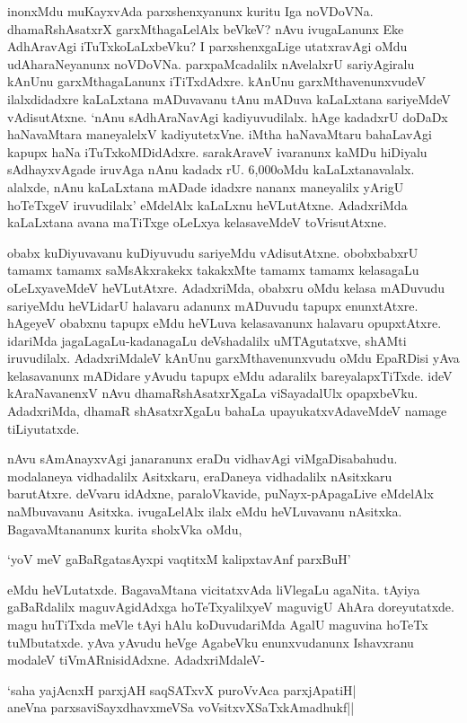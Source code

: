 inonxMdu muKayxvAda parxshenxyanunx kuritu Iga noVDoVNa. dhamaRshAsatxrX garxMthagaLelAlx beVkeV? nAvu ivugaLanunx Eke AdhAravAgi iTuTxkoLaLxbeVku? I parxshenxgaLige utatxravAgi oMdu udAharaNeyanunx noVDoVNa. parxpaMcadalilx nAvelalxrU sariyAgiralu kAnUnu garxMthagaLanunx iTiTxdAdxre. kAnUnu garxMthavenunxvudeV ilalxdidadxre kaLaLxtana mADuvavanu tAnu mADuva kaLaLxtana sariyeMdeV vAdisutAtxne. `nAnu sAdhAraNavAgi kadiyuvudilalx. hAge kadadxrU doDaDx haNavaMtara maneyalelxV kadiyutetxVne. iMtha haNavaMtaru bahaLavAgi kapupx haNa iTuTxkoMDidAdxre. sarakAraveV ivaranunx kaMDu hiDiyalu sAdhayxvAgade iruvAga nAnu kadadx rU. {\rm 6,000}oMdu kaLaLxtanavalalx. alalxde, nAnu kaLaLxtana mADade idadxre nananx maneyalilx yArigU hoTeTxgeV iruvudilalx' eMdelAlx kaLaLxnu heVLutAtxne. AdadxriMda kaLaLxtana avana maTiTxge oLeLxya kelasaveMdeV toVrisutAtxne.

obabx kuDiyuvavanu kuDiyuvudu sariyeMdu vAdisutAtxne. obobxbabxrU tamamx tamamx saMsAkxrakekx takakxMte tamamx tamamx kelasagaLu oLeLxyaveMdeV heVLutAtxre. AdadxriMda, obabxru oMdu kelasa mADuvudu sariyeMdu heVLidarU halavaru adanunx mADuvudu tapupx enunxtAtxre. hAgeyeV obabxnu tapupx eMdu heVLuva kelasavanunx halavaru opupxtAtxre. idariMda jagaLagaLu-kadanagaLu deVshadalilx uMTAgutatxve, shAMti iruvudilalx. AdadxriMdaleV kAnUnu garxMthavenunxvudu oMdu EpaRDisi yAva kelasavanunx mADidare yAvudu tapupx eMdu adaralilx bareyalapxTiTxde. ideV kAraNavanenxV nAvu dhamaRshAsatxrXgaLa viSayadalUlx opapxbeVku. AdadxriMda, dhamaR shAsatxrXgaLu bahaLa upayukatxvAdaveMdeV namage tiLiyutatxde.

nAvu sAmAnayxvAgi janaranunx eraDu vidhavAgi viMgaDisabahudu. modalaneya vidhadalilx Asitxkaru, eraDaneya vidhadalilx nAsitxkaru barutAtxre. deVvaru idAdxne, paraloVkavide, puNayx-pApagaLive eMdelAlx naMbuvavanu Asitxka. ivugaLelAlx ilalx eMdu heVLuvavanu nAsitxka. BagavaMtananunx kurita sholxVka oMdu, 

\begin{shloka}
`yoV meV gaBaRgatasAyxpi vaqtitxM kalipxtavAnf parxBuH'
\end{shloka}

eMdu heVLutatxde. BagavaMtana vicitatxvAda liVlegaLu agaNita. tAyiya gaBaRdalilx maguvAgidAdxga hoTeTxyalilxyeV maguvigU AhAra doreyutatxde. magu huTiTxda meVle tAyi hAlu koDuvudariMda AgalU maguvina hoTeTx tuMbutatxde. yAva yAvudu heVge AgabeVku enunxvudanunx Ishavxranu modaleV tiVmARnisidAdxne. AdadxriMdaleV-

\begin{shloka}
`saha yajAcnxH parxjAH saqSATxvX puroVvAca parxjApatiH|\\
aneVna parxsaviSayxdhavxmeVSa voV\s sitxvXSaTxkAmadhukf||
\end{shloka}

